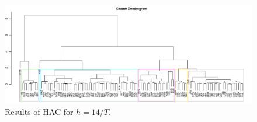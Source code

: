 \documentclass[a4paper,12pt]{article}
\numberwithin{equation}{section}
\begin{document}
\newpage 
\FloatBarrier
\begin{figure}
\includegraphics[width=\textwidth]{plots/14days/dendrogram}
\caption{Results of HAC for $h = 14/T$.}\label{fig:dend_14days}
\end{figure}
\end{document}
